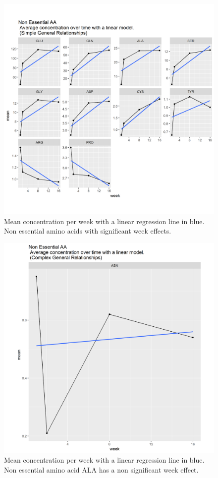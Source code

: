 \documentclass[12pt]{article}
\begin{document}
\begin{figure}[!htb]
  \includegraphics[width= \textwidth]{../week/NEAA_simple.png}
  \caption{Mean concentration per week with a linear regression line in blue. Non essential amino acids with significant week effects.}
  \label{fig:NEAA_simple}
\end{figure}

\begin{figure}[!htb]
  \includegraphics[width= \textwidth]{../week/NEAA_complex.png}
  \caption{Mean concentration per week with a linear regression line in blue. Non essential amino acid ALA has a non significant week effect.}
  \label{fig:NEAA_complex}
\end{figure}
\end{document}
